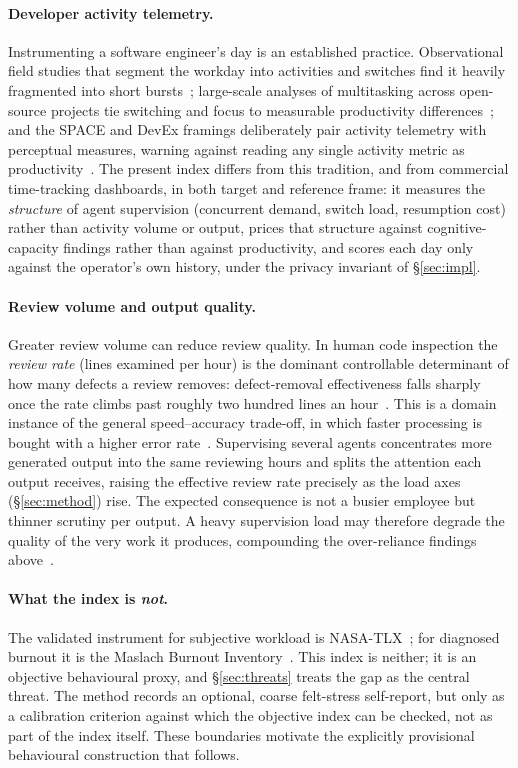 \documentclass[10pt,twocolumn]{article}
\begin{document}
\paragraph{Developer activity telemetry.} Instrumenting a software engineer's
day is an established practice. Observational field studies that segment the
workday into activities and switches find it heavily fragmented into short
bursts~\cite{meyer2017}; large-scale analyses of multitasking across
open-source projects tie switching and focus to measurable productivity
differences~\cite{vasilescu2016}; and the SPACE and DevEx framings
deliberately pair activity telemetry with perceptual measures, warning
against reading any single activity metric as
productivity~\cite{forsgren2021,noda2023}. The present index differs from
this tradition, and from commercial time-tracking dashboards, in both target
and reference frame: it measures the \emph{structure} of agent supervision
(concurrent demand, switch load, resumption cost) rather than activity volume
or output, prices that structure against cognitive-capacity findings rather
than against productivity, and scores each day only against the operator's
own history, under the privacy invariant of \S\ref{sec:impl}.

\paragraph{Review volume and output quality.} Greater review volume can reduce
review quality. In human code inspection the
\emph{review rate} (lines examined per hour) is the dominant controllable
determinant of how many defects a review removes: defect-removal effectiveness
falls sharply once the rate climbs past roughly two hundred lines an
hour~\cite{kemerer2009}. This is a domain instance of the general
speed--accuracy trade-off, in which faster processing is bought with a higher
error rate~\cite{wickelgren1977}. Supervising several agents concentrates more
generated output into the same reviewing hours and splits the attention each
output receives, raising the effective review rate precisely as the load axes
(\S\ref{sec:method}) rise. The expected consequence is not a busier
employee but thinner scrutiny per output. A heavy supervision load may therefore
degrade the quality of the very work it produces, compounding the
over-reliance findings above~\cite{perry2023,qian2024}.

\paragraph{What the index is \emph{not}.} The validated instrument for subjective
workload is NASA-TLX~\cite{hart1988}; for diagnosed burnout it is the Maslach
Burnout Inventory~\cite{maslach1981}. This index is neither; it is an objective
behavioural proxy, and \S\ref{sec:threats} treats the gap as the central threat.
The method records an optional, coarse felt-stress self-report, but only as a
calibration criterion against which the objective index can be checked, not as
part of the index itself. These boundaries motivate the explicitly provisional
behavioural construction that follows.
\end{document}
